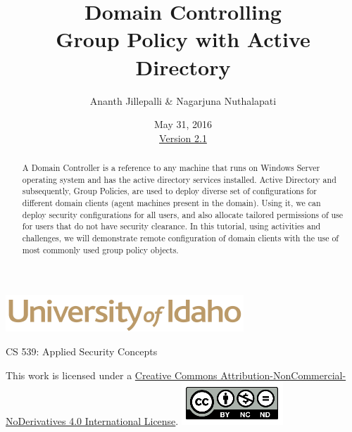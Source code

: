 \documentclass[12pt]{extarticle}
\begin{document}
\title{ Domain Controlling \\ \large Group Policy with Active Directory}
\author{Ananth Jillepalli \& Nagarjuna Nuthalapati}
\date{May 31, 2016 \\ \hyperref[changelog]{Version 2.1}} %
\renewcommand{\abstractname}{Summary}
\begin{titlepage}
\maketitle
{}
\begin{center}
\includegraphics[scale=.5]{UofI}

\large{CS 539: Applied Security Concepts}

\vskip 40pt

\end{center}
\begin{abstract}
A Domain Controller is a reference to any machine that runs on Windows Server operating system and has the active directory services installed. Active Directory and subsequently, Group Policies, are used to deploy diverse set of configurations for different domain clients (agent machines present in the domain). Using it, we can deploy security configurations for all users, and also allocate tailored permissions of use for users that do not have security clearance. In this tutorial, using activities and challenges, we will demonstrate remote configuration of domain clients with the use of most commonly used group policy objects.   
\end{abstract}


\vfill
\begin{center}
This work is licensed under a \href{http://creativecommons.org/licenses/by/4.0/}{Creative Commons Attribution-NonCommercial-NoDerivatives 4.0 International License}.
\vskip 10pt
\includegraphics[scale=.5]{cc}
\end{center}

\end{titlepage}

\end{document}
